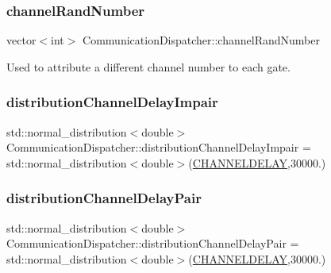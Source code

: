 \subsubsection{\texorpdfstring{channel\+Rand\+Number}{channelRandNumber}}
{\footnotesize\ttfamily vector$<$int$>$ Communication\+Dispatcher\+::channel\+Rand\+Number\hspace{0.3cm}{\ttfamily [private]}}



Used to attribute a different channel number to each gate. 

\mbox{\label{class_communication_dispatcher_a12848fe0cdce112381265d7c4ba5d62a}} 
\subsubsection{\texorpdfstring{distribution\+Channel\+Delay\+Impair}{distributionChannelDelayImpair}}
{\footnotesize\ttfamily std\+::normal\+\_\+distribution$<$double$>$ Communication\+Dispatcher\+::distribution\+Channel\+Delay\+Impair = std\+::normal\+\_\+distribution$<$double$>$(\hyperlink{structures_8h_aa2bfff4413d2bdefb6cb5b708a31660b}{C\+H\+A\+N\+N\+E\+L\+D\+E\+L\+AY},30000.)\hspace{0.3cm}{\ttfamily [private]}}

\mbox{\label{class_communication_dispatcher_a2505530ff3016939eef2ce9005847db1}} 
\subsubsection{\texorpdfstring{distribution\+Channel\+Delay\+Pair}{distributionChannelDelayPair}}
{\footnotesize\ttfamily std\+::normal\+\_\+distribution$<$double$>$ Communication\+Dispatcher\+::distribution\+Channel\+Delay\+Pair = std\+::normal\+\_\+distribution$<$double$>$(\hyperlink{structures_8h_aa2bfff4413d2bdefb6cb5b708a31660b}{C\+H\+A\+N\+N\+E\+L\+D\+E\+L\+AY},30000.)\hspace{0.3cm}{\ttfamily [private]}}


